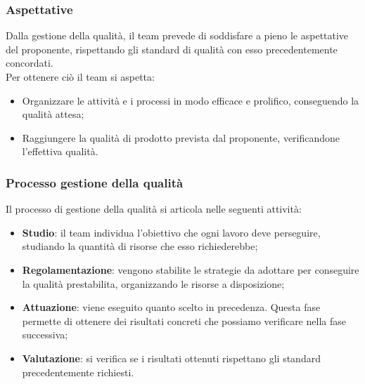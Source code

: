 \subsubsection{Aspettative}
Dalla gestione della qualità, il team prevede di soddisfare a pieno le aspettative del proponente, rispettando gli standard di qualità con esso  precedentemente concordati.\\
Per ottenere ciò il team si aspetta:
\begin{itemize}
    \item Organizzare le attività e i processi in modo efficace e prolifico, conseguendo la qualità attesa;
    \item Raggiungere la qualità di prodotto prevista dal proponente, verificandone l'effettiva qualità.
\end{itemize}


\subsubsection{Processo gestione della qualità}
Il processo di gestione della qualità si articola nelle seguenti attività:
\begin{itemize}
    \item\textbf{Studio}: il team individua l'obiettivo che ogni lavoro deve perseguire, studiando la quantità di risorse che esso richiederebbe;
    \item \textbf{Regolamentazione}: vengono stabilite le strategie da adottare per conseguire la qualità prestabilita, organizzando le risorse a disposizione;
    \item\textbf{Attuazione}: viene eseguito quanto scelto in precedenza. Questa fase permette di ottenere dei risultati concreti che possiamo verificare nella fase successiva;
    \item\textbf{Valutazione}: si verifica se i risultati ottenuti rispettano gli standard precedentemente richiesti.
\end{itemize}



